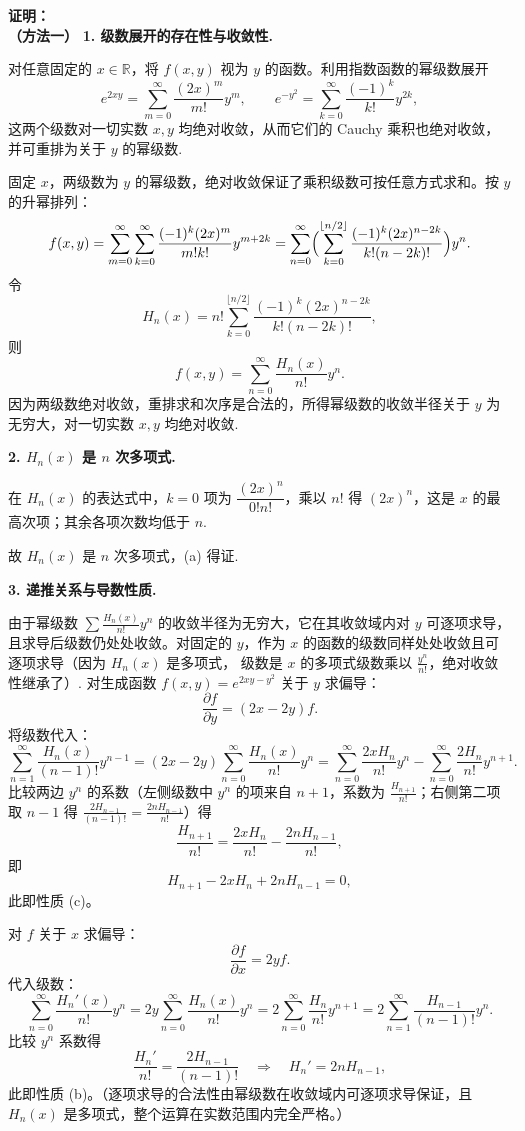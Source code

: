 \begin{enumerate}
\textbf{证明：}\\
\textbf{（方法一）}
\textbf{1. 级数展开的存在性与收敛性.}

对任意固定的 $x\in\mathbb{R}$，将 $f(x,y)$ 视为 $y$ 的函数。利用指数函数的幂级数展开
\[
e^{2xy} = \sum_{m=0}^\infty \frac{(2x)^m}{m!} y^m,\qquad
e^{-y^2} = \sum_{k=0}^\infty \frac{(-1)^k}{k!} y^{2k},
\]
这两个级数对一切实数 $x,y$ 均绝对收敛，从而它们的 Cauchy 乘积也绝对收敛，并可重排为关于 $y$ 的幂级数.

固定 $x$，两级数为 $y$ 的幂级数，绝对收敛保证了乘积级数可按任意方式求和。按 $y$ 的升幂排列：
\[
f(x,y) = \sum_{m=0}^\infty\sum_{k=0}^\infty \frac{(-1)^k (2x)^m}{m!k!} y^{m+2k}
= \sum_{n=0}^\infty \Bigl( \sum_{k=0}^{\lfloor n/2\rfloor} \frac{(-1)^k (2x)^{n-2k}}{k!(n-2k)!} \Bigr) y^n.
\]
令
\[
H_n(x) = n! \sum_{k=0}^{\lfloor n/2\rfloor} \frac{(-1)^k (2x)^{n-2k}}{k!(n-2k)!},
\]
则
\[
f(x,y) = \sum_{n=0}^\infty \frac{H_n(x)}{n!} y^n.
\]
因为两级数绝对收敛，重排求和次序是合法的，所得幂级数的收敛半径关于 $y$ 为无穷大，对一切实数 $x,y$ 均绝对收敛.

\textbf{2. $H_n(x)$ 是 $n$ 次多项式.}

在 $H_n(x)$ 的表达式中，$k=0$ 项为 $\dfrac{(2x)^n}{0!n!}$，乘以 $n!$ 得 $(2x)^n$，这是 $x$ 的最高次项；其余各项次数均低于 $n$.

故 $H_n(x)$ 是 $n$ 次多项式，(a) 得证.

\textbf{3. 递推关系与导数性质.}

由于幂级数 $\displaystyle\sum \frac{H_n(x)}{n!} y^n$ 的收敛半径为无穷大，它在其收敛域内对 $y$ 可逐项求导，且求导后级数仍处处收敛。对固定的 $y$，作为 $x$ 的函数的级数同样处处收敛且可逐项求导（因为 $H_n(x)$ 是多项式，
级数是 $x$ 的多项式级数乘以 $\displaystyle\frac{y^n}{n!}$，绝对收敛性继承了）.
对生成函数 $\displaystyle f(x,y) = e^{2xy-y^2}$ 关于 $y$ 求偏导：
\[
\frac{\partial f}{\partial y} = (2x-2y)f.
\]
将级数代入：
\[
\sum_{n=1}^\infty \frac{H_n(x)}{(n-1)!} y^{n-1}
= (2x-2y)\sum_{n=0}^\infty \frac{H_n(x)}{n!} y^n
= \sum_{n=0}^\infty \frac{2x H_n}{n!} y^n - \sum_{n=0}^\infty \frac{2 H_n}{n!} y^{n+1}.
\]
比较两边 $y^n$ 的系数（左侧级数中 $y^n$ 的项来自 $n+1$，系数为 $\displaystyle\frac{H_{n+1}}{n!}$；右侧第二项取 $n-1$ 得 $\displaystyle\frac{2H_{n-1}}{(n-1)!} = \frac{2n H_{n-1}}{n!}$）得
\[
\frac{H_{n+1}}{n!} = \frac{2x H_n}{n!} - \frac{2n H_{n-1}}{n!},
\]
即
\[
H_{n+1} - 2x H_n + 2n H_{n-1} = 0,
\]
此即性质 (c)。

对 $f$ 关于 $x$ 求偏导：
\[
\frac{\partial f}{\partial x} = 2y f.
\]
代入级数：
\[
\sum_{n=0}^\infty \frac{H_n'(x)}{n!} y^n
= 2y\sum_{n=0}^\infty \frac{H_n(x)}{n!} y^n
= 2\sum_{n=0}^\infty \frac{H_n}{n!} y^{n+1}
= 2\sum_{n=1}^\infty \frac{H_{n-1}}{(n-1)!} y^n.
\]
比较 $y^n$ 系数得
\[
\frac{H_n'}{n!} = \frac{2 H_{n-1}}{(n-1)!} \quad\Longrightarrow\quad H_n' = 2n H_{n-1},
\]
此即性质 (b)。（逐项求导的合法性由幂级数在收敛域内可逐项求导保证，且 $H_n(x)$ 是多项式，整个运算在实数范围内完全严格。）


\end{enumerate}
